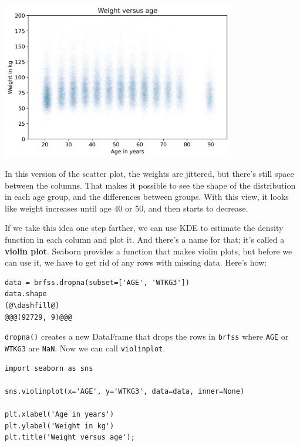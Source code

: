 \begin{center}
\includegraphics[width=4in]{chapters/09_relationships_files/09_relationships_38_0.png}
\end{center}

In this version of the scatter plot, the weights are jittered, but
there's still space between the columns. That makes it possible to see
the shape of the distribution in each age group, and the differences
between groups. With this view, it looks like weight increases until age
40 or 50, and then starts to decrease.

If we take this idea one step farther, we can use KDE to estimate the
density function in each column and plot it. And there's a name for
that; it's called a \textbf{violin plot}. Seaborn provides a function
that makes violin plots, but before we can use it, we have to get rid of
any rows with missing data. Here's how:

\begin{lstlisting}[]
data = brfss.dropna(subset=['AGE', 'WTKG3'])
data.shape
(@\dashfill@)
@@@(92729, 9)@@@
\end{lstlisting}

\passthrough{\lstinline!dropna()!} creates a new DataFrame that drops
the rows in \passthrough{\lstinline!brfss!} where
\passthrough{\lstinline!AGE!} or \passthrough{\lstinline!WTKG3!} are
\passthrough{\lstinline!NaN!}. Now we can call
\passthrough{\lstinline!violinplot!}.

\begin{lstlisting}[]
import seaborn as sns

sns.violinplot(x='AGE', y='WTKG3', data=data, inner=None)

plt.xlabel('Age in years')
plt.ylabel('Weight in kg')
plt.title('Weight versus age');
\end{lstlisting}

